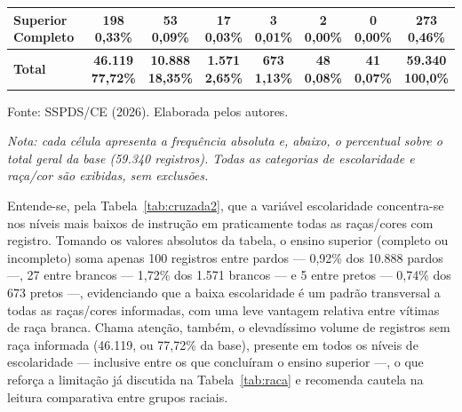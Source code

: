 \documentclass[12pt,a4paper]{article}
\newcommand{\fonte}[1]{  \vspace{-2mm}
  \begin{center}\footnotesize Fonte: #1\end{center}
}
\begin{document}
\begin{table}[H]
{\begin{tabular}{lccccccc}
Superior Completo &
\makecell{198 \\ \scriptsize 0,33\%} & \makecell{53 \\ \scriptsize 0,09\%} & \makecell{17 \\ \scriptsize 0,03\%} & \makecell{3 \\ \scriptsize 0,01\%} & \makecell{2 \\ \scriptsize 0,00\%} & \makecell{0 \\ \scriptsize 0,00\%} & \makecell{\textbf{273} \\ \scriptsize\textbf{0,46\%}} \\
\midrule
\textbf{Total} &
\makecell{\textbf{46.119} \\ \scriptsize\textbf{77,72\%}} & \makecell{\textbf{10.888} \\ \scriptsize\textbf{18,35\%}} & \makecell{\textbf{1.571} \\ \scriptsize\textbf{2,65\%}} & \makecell{\textbf{673} \\ \scriptsize\textbf{1,13\%}} & \makecell{\textbf{48} \\ \scriptsize\textbf{0,08\%}} & \makecell{\textbf{41} \\ \scriptsize\textbf{0,07\%}} & \makecell{\textbf{59.340} \\ \scriptsize\textbf{100,0\%}} \\
\bottomrule
\end{tabular}}
\renewcommand{\arraystretch}{1}
\end{table}
\fonte{SSPDS/CE (2026). Elaborada pelos autores.}

\small\textit{Nota: cada célula apresenta a frequência absoluta e, abaixo, o percentual sobre o total geral da base (59.340 registros). Todas as categorias de escolaridade e raça/cor são exibidas, sem exclusões.}
\normalsize

\vspace{2mm}

Entende-se, pela Tabela~\ref{tab:cruzada2}, que a variável escolaridade concentra-se nos níveis mais baixos de instrução em praticamente todas as raças/cores com registro. Tomando os valores absolutos da tabela, o ensino superior (completo ou incompleto) soma apenas 100 registros entre pardos --- 0,92\% dos 10.888 pardos ---, 27 entre brancos --- 1,72\% dos 1.571 brancos --- e 5 entre pretos --- 0,74\% dos 673 pretos ---, evidenciando que a baixa escolaridade é um padrão transversal a todas as raças/cores informadas, com uma leve vantagem relativa entre vítimas de raça branca. Chama atenção, também, o elevadíssimo volume de registros sem raça informada (46.119, ou 77,72\% da base), presente em todos os níveis de escolaridade --- inclusive entre os que concluíram o ensino superior ---, o que reforça a limitação já discutida na Tabela~\ref{tab:raca} e recomenda cautela na leitura comparativa entre grupos raciais.
\end{document}
